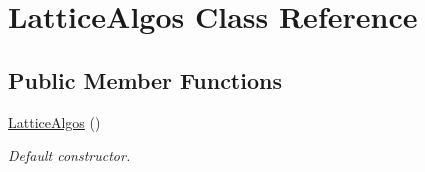 \hypertarget{class_lattice_algos}{
\section{LatticeAlgos Class Reference}
\label{class_lattice_algos}
}
\subsection*{Public Member Functions}
\begin{DoxyCompactItemize}
\item 
\hypertarget{class_lattice_algos_ae3f96fdf1928948a830de0ec273534c1}{
\hyperlink{class_lattice_algos_ae3f96fdf1928948a830de0ec273534c1}{LatticeAlgos} ()}
\label{class_lattice_algos_ae3f96fdf1928948a830de0ec273534c1}

\begin{DoxyCompactList}\small\item\em Default constructor. \item\end{DoxyCompactList}\end{DoxyCompactItemize}
